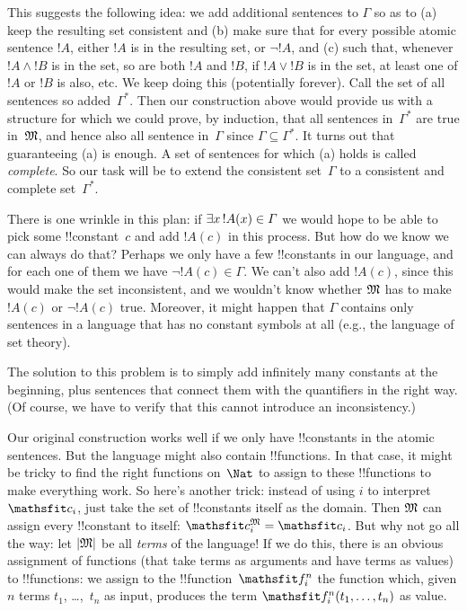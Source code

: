 \documentclass[../../../include/open-logic-section]{subfiles}
\begin{document}
This suggests the following idea: we add additional sentences to
$\Gamma$ so as to (a) keep the resulting set consistent and (b) make
sure that for every possible atomic sentence $!A$, either $!A$ is in
the resulting set, or $\lnot !A$, and (c) such that, whenever $!A
\land !B$ is in the set, so are both $!A$ and $!B$, if $!A \lor !B$ is
in the set, at least one of $!A$ or $!B$ is also, etc.  We keep doing
this (potentially forever).  Call the set of all sentences so
added~$\Gamma^*$.  Then our construction above would provide us with a
structure for which we could prove, by induction, that all sentences
in~$\Gamma^*$ are true in~$\mathfrak M$, and hence also all sentence
in~$\Gamma$ since $\Gamma \subseteq \Gamma^*$.  It turns out that
guaranteeing (a) is enough. A set of sentences for which (a) holds is
called \emph{complete}. So our task will be to extend the consistent
set~$\Gamma$ to a consistent and complete set~$\Gamma^*$.

There is one wrinkle in this plan: if $\lexists[x][!A(x)] \in \Gamma$
we would hope to be able to pick some !!{constant}~$c$ and add $!A(c)$
in this process.  But how do we know we can always do that?  Perhaps we
only have a few !!{constant}s in our language, and for each one of
them we have $\lnot !A(c) \in \Gamma$.  We can't also add $!A(c)$,
since this would make the set inconsistent, and we wouldn't know
whether $\mathfrak M$ has to make $!A(c)$ or $\lnot !A(c)$ true.
Moreover, it might happen that $\Gamma$ contains only sentences in a
language that has no constant symbols at all (e.g., the language of
set theory).

The solution to this problem is to simply add infinitely many
constants at the beginning, plus sentences that connect them with the
quantifiers in the right way.  (Of course, we have to verify that this
cannot introduce an inconsistency.)

Our original construction works well if we only have !!{constant}s in
the atomic sentences.  But the language might also contain
!!{function}s.  In that case, it might be tricky to find the right
functions on~$\Nat$ to assign to these !!{function}s to make
everything work.  So here's another trick: instead of using $i$ to
interpret $\Obj c_i$, just take the set of !!{constant}s itself as the
domain.  Then $\mathfrak M$ can assign every !!{constant} to itself:
$\Assign{\Obj c_i}{M} = \Obj c_i$.  But why not go all the way: let
$\left| \mathfrak M \right|$ be all \emph{terms} of the language!{} If we do this,
there is an obvious assignment of functions (that take terms as
arguments and have terms as values) to !!{function}s: we assign to the
!!{function}~$\Obj f^n_i$ the function which, given $n$ terms $t_1$,
\dots,~$t_n$ as input, produces the term $\Obj f^n_i(t_1, \dots, t_n)$
as value.
\end{document}
